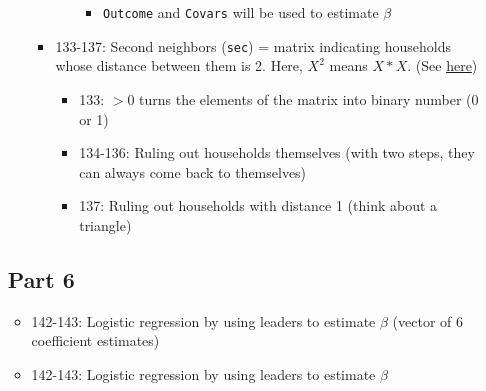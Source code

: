 \documentclass[10pt,letterpaper]{article}
\begin{document}
\begin{itemize}
\begin{itemize}
\begin{itemize}
\begin{itemize}
\begin{itemize}
              \item \texttt{Outcome} and \texttt{Covars} will be used to estimate $\beta$
            \end{itemize}
        \end{itemize}
      \item 133-137: Second neighbors (\texttt{sec}) = matrix indicating households whose distance between them is 2.
        Here, $X^2$ means $X * X$.
        (See \href{https://en.wikipedia.org/wiki/Adjacency_matrix#Matrix_powers}{here})
        \begin{itemize}
		  \item 133: $>0$ turns the elements of the matrix into binary number (0 or 1)
          \item 134-136: Ruling out households themselves (with two steps, they can always come back to themselves)
          \item 137: Ruling out households with distance 1 (think about a triangle)
        \end{itemize}
    \end{itemize}
\end{itemize}

\subsection*{Part 6}
\begin{itemize}
  \item 142-143: Logistic regression by using leaders to estimate $\beta$ (vector of 6 coefficient estimates)
  \item 142-143: Logistic regression by using leaders to estimate $\beta$
\end{itemize}


\end{itemize}
\end{document}
